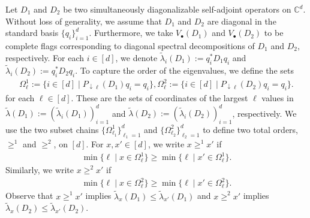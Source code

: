 \documentclass[12pt]{article}
\theoremstyle{definition}
\numberwithin{equation}{section}
\numberwithin{equation}{section}
\newcommand{\la}{\lambda}
\newcommand{\da}{\downarrow}
\newcommand{\Og}{\Omega}
\newcommand{\bC}{\mathbb{C}}
\begin{document}
Let \(D_1\) and \(D_2\) be two simultaneously diagonalizable self-adjoint operators on \(\bC^d\). Without loss of generality, we assume that \(D_1\) and \(D_2\) are diagonal in the standard basis \(\{q_i\}_{i=1}^d\). Furthermore, we take \(V_\bullet (D_1)\) and \(V_\bullet(D_2)\) to be complete flags corresponding to diagonal spectral decompositions of \(D_1\) and \(D_2\), respectively. For each \(i \in [d]\), we denote \(\tilde{\la}_i (D_1) := q_i^* D_1 q_i\) and \(\tilde{\la}_i(D_2) := q_i^* D_2 q_i\). To capture the order of the eigenvalues, we define the sets
\begin{gather}
\Og^1_\ell := \{ i \in [d] \mid P_{\da \ell} (D_1) q_i = q_i\}, \Og^2_\ell := \{ i \in [d] \mid P_{\da \ell} (D_2) q_i = q_i\}.
\end{gather}
for each \(\ell \in [d]\). These are the sets of coordinates of the largest \(\ell\) values in \(\tilde{\la} (D_1) := (\tilde{\la}_i(D_1))_{i=1}^d\) and \(\tilde{\la} (D_2) := (\tilde{\la}_i (D_2))_{i=1}^d\), respectively. We use the two subset chains \(\{ \Og^{1}_{\ell_1}\}_{\ell_1 =1}^d\) and \(\{ \Og^{2}_{\ell_2}\}_{\ell_2 =1}^d\) to define two total orders, \(\geq^1\) and \(\geq^2\), on \([d]\). For \(x, x' \in [d]\), we write \(x \geq^1 x'\) if  
\begin{align}
\label{def: induced total order}
\min \{ \ell \mid x \in \Og^1_\ell\} \geq \min \{ \ell \mid x' \in \Og^1_\ell\}.
\end{align}
Similarly, we write \(x \geq^2 x'\) if
\begin{align}
\min \{ \ell \mid x \in \Og^2_\ell\} \geq \min \{ \ell \mid x' \in \Og^2_\ell\}.
\end{align}
Observe that \(x \geq^1 x'\) implies \(\tilde{\la}_x (D_1) \leq \tilde{\la}_{x'} (D_1)\) and \(x \geq^2 x'\) implies \(\tilde{\la}_x (D_2) \leq \tilde{\la}_{x'} (D_2)\).
\end{document}
